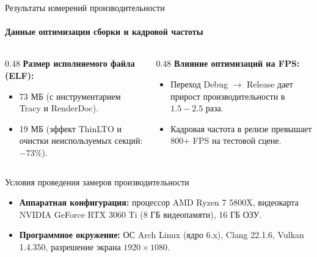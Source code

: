 \begin{frame}{Результаты измерений производительности}
  \framesubtitle{Данные оптимизации сборки и кадровой частоты}
  \begin{columns}[T]
    \begin{column}{0.48\textwidth}
      \textbf{Размер исполняемого файла (ELF):}
      \begin{itemize}
        \item {} 73 МБ (с инструментарием Tracy и RenderDoc).
        \item {} 19 МБ (эффект ThinLTO и очистки неиспользуемых секций: $-73\%$).
      \end{itemize}
    \end{column}
    \begin{column}{0.48\textwidth}
      \textbf{Влияние оптимизаций на FPS:}
      \begin{itemize}
        \item Переход Debug $\to$ Release дает прирост производительности в $1.5{-}2.5$ раза.
        \item Кадровая частота в релизе превышает 800+ FPS на тестовой сцене.
      \end{itemize}
    \end{column}
  \end{columns}
  \vspace{1.0em}
  \small
  \begin{block}{Условия проведения замеров производительности}
    \scriptsize
    \begin{itemize}
      \item \textbf{Аппаратная конфигурация:} процессор AMD Ryzen 7 5800X,
            видеокарта NVIDIA GeForce RTX 3060 Ti (8 ГБ видеопамяти), 16 ГБ ОЗУ.
      \item \textbf{Программное окружение:} ОС Arch Linux (ядро 6.x), Clang 22.1.6,
            Vulkan 1.4.350, разрешение экрана $1920\times1080$.
    \end{itemize}
  \end{block}
\end{frame}

